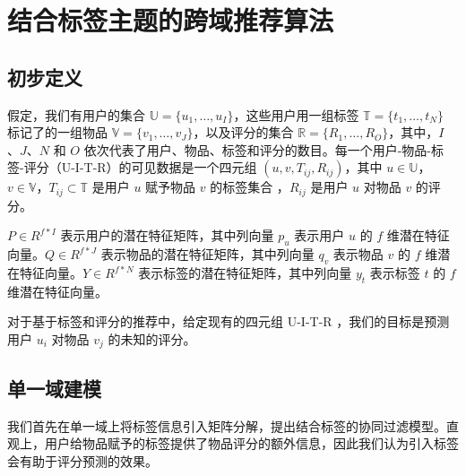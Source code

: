 \chapter{结合标签主题的跨域推荐算法}

\section{初步定义}
假定，我们有用户的集合 $\mathbb{U}=\{u_1,\dots,u_I \}$，这些用户用一组标签 $\mathbb{T}=\{t_1,\dots,t_N \}$ 标记了的一组物品 $\mathbb{V}=\{v_1,\dots,v_J \}$，以及评分的集合  $\mathbb{R}=\{R_1,\dots,R_O \}$，其中，$I$ 、$J$、$N$ 和 $O$ 依次代表了用户、物品、标签和评分的数目。每一个用户-物品-标签-评分（U-I-T-R）的可见数据是一个四元组 $(u, v, T_{ij}, R_{ij})$，其中 $u \in \mathbb{U}$，$v \in \mathbb{V}$，$T_{ij} \subset \mathbb{T}$ 是用户 $u$ 赋予物品 $v$ 的标签集合 ，$R_{ij}$ 是用户 $u$ 对物品 $v$ 的评分。

$P \in R^{f*I}$ 表示用户的潜在特征矩阵，其中列向量 $p_u$ 表示用户 $u$ 的 $f$ 维潜在特征向量。$Q \in R^{f*J}$ 表示物品的潜在特征矩阵，其中列向量 $q_v$ 表示物品 $v$ 的 $f$ 维潜在特征向量。$Y \in R^{f*N}$ 表示标签的潜在特征矩阵，其中列向量 $y_t$ 表示标签 $t$ 的 $f$ 维潜在特征向量。

对于基于标签和评分的推荐中，给定现有的四元组 U-I-T-R ，我们的目标是预测用户 $u_i$ 对物品 $v_j$ 的未知的评分。

\section{单一域建模}
我们首先在单一域上将标签信息引入矩阵分解，提出结合标签的协同过滤模型。直观上，用户给物品赋予的标签提供了物品评分的额外信息，因此我们认为引入标签会有助于评分预测的效果。

